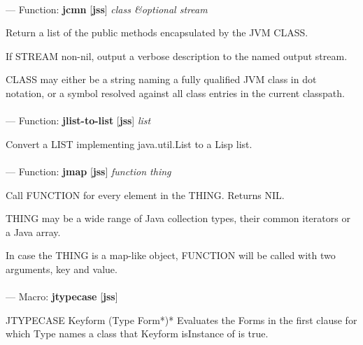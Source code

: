 \paragraph{}
\label{JSS:JCMN}
--- Function: \textbf{jcmn} [\textbf{jss}] \textit{class \&optional stream}

\begin{adjustwidth}{5em}{5em}
Return a list of the public methods encapsulated by the JVM CLASS.

If STREAM non-nil, output a verbose description to the named output stream.

CLASS may either be a string naming a fully qualified JVM class in dot
notation, or a symbol resolved against all class entries in the
current classpath.
\end{adjustwidth}

\paragraph{}
\label{JSS:JLIST-TO-LIST}
--- Function: \textbf{jlist-to-list} [\textbf{jss}] \textit{list}

\begin{adjustwidth}{5em}{5em}
Convert a LIST implementing java.util.List to a Lisp list.
\end{adjustwidth}

\paragraph{}
\label{JSS:JMAP}
--- Function: \textbf{jmap} [\textbf{jss}] \textit{function thing}

\begin{adjustwidth}{5em}{5em}
Call FUNCTION for every element in the THING.  Returns NIL.

THING may be a wide range of Java collection types, their common iterators or
a Java array.

In case the THING is a map-like object, FUNCTION will be called with two
arguments, key and value.
\end{adjustwidth}

\paragraph{}
\label{JSS:JTYPECASE}
--- Macro: \textbf{jtypecase} [\textbf{jss}] \textit{}

\begin{adjustwidth}{5em}{5em}
JTYPECASE Keyform {(Type Form*)}*
  Evaluates the Forms in the first clause for which Type names a class that Keyform isInstance of
  is true.
\end{adjustwidth}

